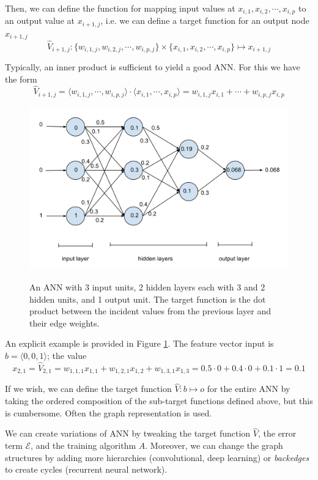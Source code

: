 \documentclass[12pt]{article}  %
\begin{document}
Then, we can define the function for mapping input values at $x_{i,1}, x_{i,2}, \cdots, x_{i,p}$ to an output value at $x_{i+1,j}$, i.e. we can define a target function for an output node $x_{i+1,j}$ $$\hat{V}_{i+1,j} : \{ w_{i,1,j}, w_{i,2,j}, \cdots, w_{i,p,j} \} \times \{ x_{i,1}, x_{i,2}, \cdots, x_{i,p} \} \mapsto x_{i+1,j}$$

Typically, an inner product is sufficient to yield a good ANN. For this we have the form $$\hat{V}_{i+1,j} = \langle  w_{i,1,j}, \cdots, w_{i,p,j}  \rangle \cdot \langle  x_{i,1}, \cdots, x_{i,p}  \rangle = w_{i,1,j}x_{i,1} + \cdots + w_{i,p,j}x_{i,p}$$

\begin{figure}
\centering
\includegraphics[scale=0.5]{images/ANN.png}\\
\caption{An ANN with 3 input units, 2 hidden layers each with 3 and 2 hidden units, and 1 output unit. The target function is the dot product between the incident values from the previous layer and their edge weights.}\label{ANN-fig}
\end{figure}

An explicit example is provided in Figure \ref{ANN-fig}. The feature vector input is $b = \langle 0,0,1 \rangle$; the value $$x_{2,1} = \hat{V}_{2,1} = w_{1,1,1}x_{1,1} + w_{1,2,1}x_{1,2} + w_{1,3,1}x_{1,3} = 0.5 \cdot 0 + 0.4 \cdot 0 + 0.1 \cdot 1 = 0.1$$

If we wish, we can define the target function $\hat{V} : b \mapsto o$ for the entire ANN by taking the ordered composition of the sub-target functions defined above, but this is cumbersome. Often the graph representation is used.

We can create variations of ANN by tweaking the target function $\hat{V}$, the error term $\mathcal{E}$, and the training algorithm $A$. Moreover, we can change the graph structures by adding more hierarchies (convolutional, deep learning) or {\em backedges} to create cycles (recurrent neural network).
\end{document}
